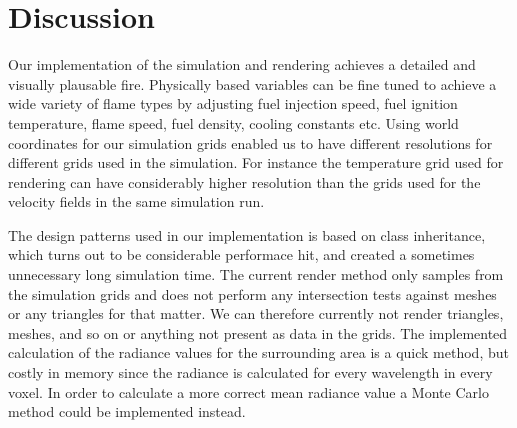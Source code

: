 \section{Discussion}
Our implementation of the simulation and rendering achieves a detailed and visually plausable fire. Physically based variables can be fine tuned to achieve a wide variety of flame types by adjusting fuel injection speed, fuel ignition temperature, flame speed, fuel density, cooling constants etc.  Using world coordinates for our simulation grids enabled us to have different resolutions for different grids used in the simulation. For instance the temperature grid used for rendering can have considerably higher resolution than the grids used for the velocity fields in the same simulation run.

The design patterns used in our implementation is based on class inheritance, which turns out to be considerable performace hit, and created a sometimes unnecessary long simulation time. The current render method only samples from the simulation grids and does not perform any intersection tests against meshes or any triangles for that matter. We can therefore currently not render triangles, meshes, and so on or anything not present as data in the grids. The implemented calculation of the radiance values for the surrounding area is a quick method, but costly in memory since the radiance is calculated for every wavelength in every voxel. In order to calculate a more correct mean radiance value  a Monte Carlo method could be implemented instead. 